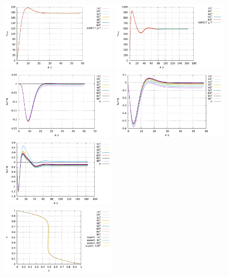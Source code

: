 \begin{center}
\includegraphics[width=5.7cm]{python_codes/fieldstone_110/results_EBA/vrms_Ra1e5.pdf}
\includegraphics[width=5.7cm]{python_codes/fieldstone_110/results_EBA/vrms_Ra1e6.pdf}\\
\includegraphics[width=5.7cm]{python_codes/fieldstone_110/results_EBA/q_Ra1e4.pdf}
\includegraphics[width=5.7cm]{python_codes/fieldstone_110/results_EBA/q_Ra1e5.pdf}
\includegraphics[width=5.7cm]{python_codes/fieldstone_110/results_EBA/q_Ra1e6.pdf}\\
\includegraphics[width=5.7cm]{python_codes/fieldstone_110/results_EBA/T_profile_Ra1e4.pdf}

\end{center}
